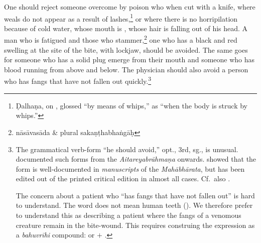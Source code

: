 \begin{translation}[resume]
 \item [3.40cd--3.43ab]  
 
One should reject someone overcome by poison who  
when cut with a knife, where weals do not appear as a result of  
 lashes,\footnote{Ḍalhaṇa, on , glossed  
“by means of whips,” as “when the body is struck by whips.”} or where 
there is no horripilation because of cold water, whose mouth is 
, whose hair is falling out of his head.  A man who is 
fatigued and those who stammer,\footnote{nāsāvasāda \& plural 
sakaṇṭhabhaṅgāḥ}  
one who has a black and red swelling at the site of the bite, with
lockjaw, should be avoided.  The same goes for someone who has a solid
plug emerge from their mouth  and someone who has blood running from
above and below.
% 
% 
The physician should also avoid a person who has fangs that have not
fallen out quickly.\footnote{The grammatical verb-form
     “he  should avoid,” opt., 3rd, sg., is unusual.
    \citet[10\,ff]{reno-1940} documented such forms from the
    \emph{Aitareyabrāhmaṇa} onwards.  \citet[\P  6.3.3 “Peculiar optative
    endings”, pp.\,176--177]{ober-2003} showed that the form is
    well-documented in \emph{manuscripts} of the \emph{Mahābhārata}, but
    has been edited out of the printed critical edition in almost all
    cases. Cf.\ also \cite{kuli-2006}.  
    
    The concern about a patient who “has fangs that have not fallen
out” is hard  to understand.  The word  does not mean
human teeth  ().  We therefore prefer to understand
this as describing a patient where the  fangs of a venomous
creature remain in the bite-wound.  This requires  construing the
expression as a \emph{bahuvrīhi} compound:  or
 $+$ .}
\end{translation}
